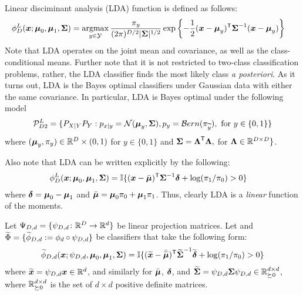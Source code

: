 \documentclass[10pt]{article}
\begin{document}
Linear disciminant analysis (LDA)  function is defined as follows: 
\begin{align}
	\phi_D^L(\bx; \bmu_0, \bmu_1, \bSig) &= \argmax_{y \in \mc{Y}} \frac{\pi_y}{(2\pi)^{D/2}|\bSig|^{1/2} }  \exp\left\{-\frac{1}{2} (\bx-\bmu_y)\T \bSig^{-1}(\bx-\bmu_y) \right\}  
\end{align}
Note that LDA operates on the joint mean and covariance, as well as the class-conditional means.  Further note that it is not restricted to two-class classification problems, rather, the LDA classifier finds the most likely class \emph{a posteriori}.  As it turns out, LDA is the Bayes optimal classifiers under Gaussian data with either the same covariance. In particular, LDA is Bayes optimal under the following model
	\begin{align}
		\mathcal{P}^L_{D2}=\{P_{X|Y}P_Y : p_{x|y}=\mathcal{N}(\boldsymbol{\mu}_{y},\boldsymbol{\Sigma}), p_y = \mathcal{B}ern( \pi_{\widetilde{y}}), \text{ for } y \in \{0,1\} \}
	\end{align}
 where $(\boldsymbol{\mu}_y, \pi_y) \in \mathbb{R}^D \times (0,1)$ for $y \in \{0,1\}$ and $\boldsymbol{\Sigma} = \boldsymbol{\Lambda}^{\mathsf{T}} \boldsymbol{\Lambda},$ for $ \boldsymbol{\Lambda} \in \mathbb{R}^{D \times D}\}$.
    

Also note that LDA can be written explicitly by the following:
\begin{align}
\phi_D^L(\boldsymbol{x}; \boldsymbol{\mu}_0, \boldsymbol{\mu}_1, \boldsymbol{\Sigma}) 	&=\mathbb{I}\{(\boldsymbol{x} - \bar{\boldsymbol{\mu}})^{\mathsf{T}} \boldsymbol{\Sigma}^{-1} \boldsymbol{\delta} + \log  (\pi_1 / \pi_0) > 0\}
\end{align}
where $\boldsymbol{\delta}=\boldsymbol{\mu}_0-\boldsymbol{\mu}_1$ and $\bar{\boldsymbol{\mu}}=\boldsymbol{\mu}_0 \pi_0+\boldsymbol{\mu}_1 \pi_1$.  Thus, clearly LDA is a \emph{linear} function of the moments. 



Let $\Psi_{D,d} =\{\psi_{D,d} {\colon} \mathbb{R}^D \to \mathbb{R}^d\}$ be linear projection matrices.  Let  and $\widetilde{\Phi} = \{\widetilde{\phi}_{D,d} := \phi_d \circ  \psi_{D,d}\}$ be classifiers that take the following form:
\begin{align}
	\widetilde{\phi}_{D,d}(\boldsymbol{x}; \psi_{D,d}, \boldsymbol{\mu}_0,\boldsymbol{\mu}_1,\boldsymbol{\Sigma}) = \mathbb{I}\{(\widetilde{\boldsymbol{x}} - \bar{\widetilde{\boldsymbol{\mu}}})^{\mathsf{T}} \widetilde{\boldsymbol{\Sigma}}^{-1} \widetilde{\boldsymbol{\delta}} + \log  (\pi_1 / \pi_0) > 0\}
\end{align}
where $\widetilde{\boldsymbol{x}}=\psi_{D,d} \boldsymbol{x} \in \mathbb{R}^d$, and similarly for $\bar{\boldsymbol{\mu}}$, $\boldsymbol{\delta}$, and $\widetilde{\boldsymbol{\Sigma}}=\psi_{D,d} \boldsymbol{\Sigma} \psi_{D,d} \in \mathbb{R}^{d \times d}_{\succeq 0}  $, where $\mathbb{R}^{d \times d}_{\succeq 0}$ is the set of $d \times d$ positive definite matrices. 
\end{document}
